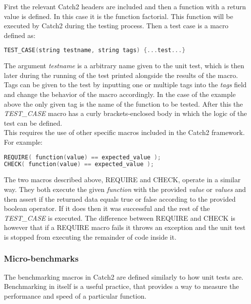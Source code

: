 First the relevant Catch2 headers are included and then a function with a return value is defined. In this case it is the function factorial. 
This function will be executed by Catch2 during the testing process. Then a test case is a macro defined as:

\begin{minipage}{\textwidth}
\begin{lstlisting}[language=C++]
TEST_CASE(string testname, string tags) {...test...}
\end{lstlisting}
\end{minipage}

The argument \textit{testname} is a arbitrary name given to the unit test, which is then later during the running of the test printed alongside the results of the macro.
Tags can be given to the test by inputting one or multiple tags into the \textit{tags} field and change the behavior of the macro accordingly. In the case of the example above
the only given tag is the name of the function to be tested. After this the \textit{TEST\_CASE} macro has a curly brackets-enclosed body in which the logic of the test can 
be defined.\\
This requires the use of other specific macros included in the Catch2 framework. For example:


\begin{minipage}{\textwidth}
\begin{lstlisting}[language=C++]
REQUIRE( function(value) == expected_value );
CHECK( function(value) == expected_value );
\end{lstlisting}
\end{minipage}

The two macros described above, REQUIRE and CHECK, operate in a similar way. They both execute the given \textit{function} with the provided \textit{value} or \textit{values}
and then assert if the returned data equals true or false according to the provided boolean operator. If it does then it was successful and the rest of the \textit{TEST\_CASE} is executed. The difference 
between REQUIRE and CHECK is however that if a REQUIRE macro fails it throws an exception and the unit test is stopped from executing the remainder of code inside it.

\subsubsection{Micro-benchmarks}
The benchmarking macros in Catch2 are defined similarly to how unit tests are. Benchmarking in itself is a useful practice, that provides a way to measure the performance
and speed of a particular function.

